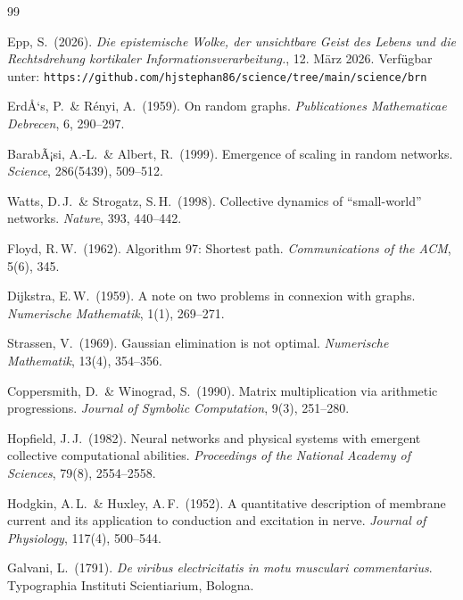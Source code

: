 ﻿\documentclass[a4paper,12pt]{article}
\theoremstyle{definition}
\begin{document}
	\begin{thebibliography}{99}

	Epp, S.\ (2026).
	\textit{Die epistemische Wolke, der unsichtbare Geist des Lebens und die
	Rechtsdrehung kortikaler Informationsverarbeitung.}, 12. März 2026.
	Verfügbar unter: \texttt{https://github.com/hjstephan86/science/tree/main/science/brn}

	ErdÅ‘s, P.\ \& Rényi, A.\ (1959).
	On random graphs.
	\textit{Publicationes Mathematicae Debrecen}, 6, 290--297.

	BarabÃ¡si, A.-L.\ \& Albert, R.\ (1999).
	Emergence of scaling in random networks.
	\textit{Science}, 286(5439), 509--512.

	Watts, D.\,J.\ \& Strogatz, S.\,H.\ (1998).
	Collective dynamics of ``small-world'' networks.
	\textit{Nature}, 393, 440--442.

	Floyd, R.\,W.\ (1962).
	Algorithm 97: Shortest path.
	\textit{Communications of the ACM}, 5(6), 345.

	Dijkstra, E.\,W.\ (1959).
	A note on two problems in connexion with graphs.
	\textit{Numerische Mathematik}, 1(1), 269--271.

	Strassen, V.\ (1969).
	Gaussian elimination is not optimal.
	\textit{Numerische Mathematik}, 13(4), 354--356.

	Coppersmith, D.\ \& Winograd, S.\ (1990).
	Matrix multiplication via arithmetic progressions.
	\textit{Journal of Symbolic Computation}, 9(3), 251--280.

	Hopfield, J.\,J.\ (1982).
	Neural networks and physical systems with emergent collective computational abilities.
	\textit{Proceedings of the National Academy of Sciences}, 79(8), 2554--2558.

	Hodgkin, A.\,L.\ \& Huxley, A.\,F.\ (1952).
	A quantitative description of membrane current and its application to conduction and excitation in nerve.
	\textit{Journal of Physiology}, 117(4), 500--544.

	Galvani, L.\ (1791).
	\textit{De viribus electricitatis in motu musculari commentarius}.
	Typographia Instituti Scientiarium, Bologna.


\end{thebibliography}
\end{document}
